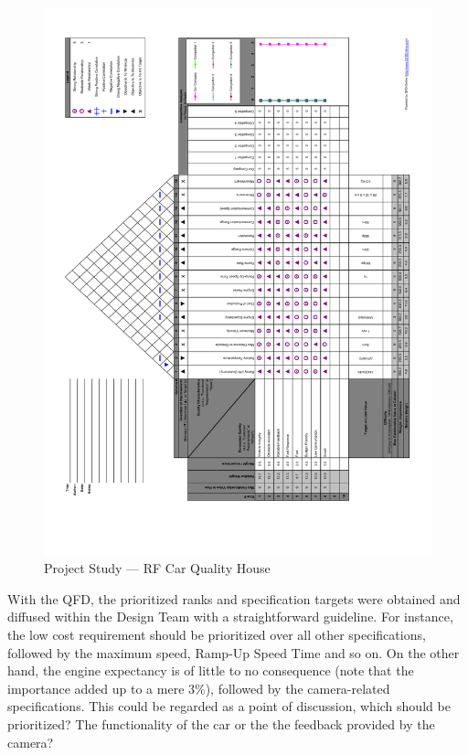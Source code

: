 \begin{figure}[!htbp]
   \centering
       \includegraphics[page=1,width=1.0\textwidth]{sec/pdf/QFDv3.pdf} 
 \caption{Project Study --- RF Car Quality House}%
\label{fig:QFD}
\end{figure}
%
With the QFD, the prioritized ranks and specification targets were obtained and diffused within the Design Team with a
straightforward guideline. For instance, the low cost requirement should be
prioritized over all other specifications, followed by the maximum speed,
Ramp-Up Speed Time and so on.  On the other hand, the engine expectancy is of
little to no consequence (note that the importance added up to a mere 3\%),
followed by the camera-related specifications. This could be regarded as
a point of discussion, which should be prioritized? The functionality of the car
or the the feedback provided by the camera?

